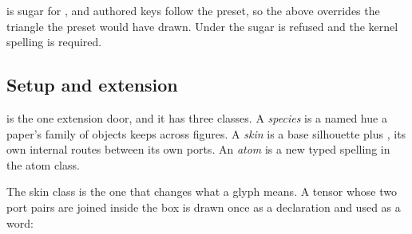 \begin{tnexample}[
  formula={M^{ij}=\sum_{k}e\,(A^{(i,k)}\otimes\overline{A}^{(j,k)})
    \,e^{-1}},
  caption={a fuser, the doubled layer, and its inverse},
  index={The two fusion atoms span both rows and combine the ket and bra
    virtual indices into one; between them the two layers carry the
    physical indices $i$ and $j$.  The frame's bond between the rows is
    the ancillary index $k$ the sum runs over.},
  signature={kernel-boundary|signature=open:e, open:w, phys:n, phys:s}]
\begin{tenkz}[rows={op,op}, cols=3]
   
\end{tenkz}
\end{tnexample}

\dbendpar {} is sugar for
, and authored keys
follow the preset, so the  above overrides the
triangle the preset would have drawn.  Under
 the sugar is refused and the kernel
spelling is required.

\subsection{Setup and extension}

 is the one extension door, and it has three classes.
A \emph{species} is a named hue a paper's family of objects keeps across
figures.  A \emph{skin} is a base silhouette plus , its
own internal routes between its own ports.  An \emph{atom} is a new typed
spelling in the atom class.

The skin class is the one that changes what a glyph means.  A tensor whose
two port pairs are joined inside the box is drawn once as a declaration
and used as a word:

